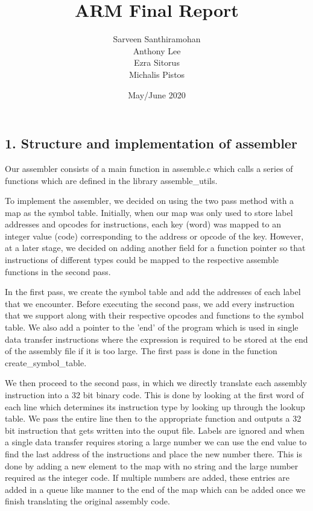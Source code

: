 \documentclass[a4paper]{article}
\title{ARM Final Report}
\author{Sarveen Santhiramohan \\ Anthony Lee\\ Ezra Sitorus\\ Michalis Pistos}
\date{May/June 2020}
\begin{document}
\maketitle

\subsection*{1. Structure and implementation of assembler}

Our assembler consists of a main function in assemble.c which calls a series of functions which
are defined in the library assemble{\_}utils. 

To implement the assembler, we decided on using the two pass method with a map as the symbol table.
Initially, when our map was only used to store label addresses and opcodes for instructions, each
key (word) was mapped to an integer value (code) corresponding to the address or opcode of the key.
However, at a later stage, we decided on adding another field for a function pointer so that instructions
of different types could be mapped to the respective assemble functions in the second pass. 
\par
In the first pass, we create the symbol table and add the addresses of each label that we encounter.
Before executing the second pass, we add every instruction that we support along with their
respective opcodes and functions to the symbol table. We also add a pointer to the 'end' of the program
which is used in single data transfer instructions where the expression is required to be stored at the 
end of the assembly file if it is too large. The first pass is done in the function create{\_}symbol{\_}table.
\par
We then proceed to the second pass, in which we directly translate each assembly instruction into a 32 bit binary code.
This is done by looking at the first word of each line which determines its instruction type by looking up through the 
lookup table. We pass the entire line then to the appropriate function and outputs a 32 bit instruction that gets written 
into the ouput file. Labels are ignored and when a single data transfer requires storing a large number we can use the end value 
to find the last address of the instructions and place the new number there. This is done by adding a new element
to the map with no string and the large number required as the integer code. If multiple numbers are added,
these entries are added in a queue like manner to the end of the map which can be added once we finish 
translating the original assembly code.
\end{document}
